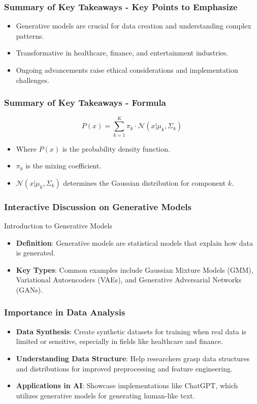 \documentclass[aspectratio=169]{beamer}
\begin{document}
\begin{frame}[fragile]
    \frametitle{Summary of Key Takeaways - Key Points to Emphasize}
    \begin{itemize}
        \item Generative models are crucial for data creation and understanding complex patterns.
        \item Transformative in healthcare, finance, and entertainment industries.
        \item Ongoing advancements raise ethical considerations and implementation challenges.
    \end{itemize}
\end{frame}

\begin{frame}[fragile]
    \frametitle{Summary of Key Takeaways - Formula}
    \begin{equation}
        P(x) = \sum_{k=1}^{K} \pi_k \cdot \mathcal{N}(x | \mu_k, \Sigma_k)
    \end{equation}
    \begin{itemize}
        \item Where \(P(x)\) is the probability density function.
        \item \(\pi_k\) is the mixing coefficient.
        \item \(\mathcal{N}(x | \mu_k, \Sigma_k)\) determines the Gaussian distribution for component \(k\).
    \end{itemize}
\end{frame}

\begin{frame}[fragile]
    \frametitle{Interactive Discussion on Generative Models}
    \begin{block}{Introduction to Generative Models}
        \begin{itemize}
            \item \textbf{Definition}: Generative models are statistical models that explain how data is generated.
            \item \textbf{Key Types}: Common examples include Gaussian Mixture Models (GMM), Variational Autoencoders (VAEs), and Generative Adversarial Networks (GANs).
        \end{itemize}
    \end{block}
\end{frame}

\begin{frame}[fragile]
    \frametitle{Importance in Data Analysis}
    \begin{itemize}
        \item \textbf{Data Synthesis}: Create synthetic datasets for training when real data is limited or sensitive, especially in fields like healthcare and finance.
        \item \textbf{Understanding Data Structure}: Help researchers grasp data structures and distributions for improved preprocessing and feature engineering.
        \item \textbf{Applications in AI}: Showcase implementations like ChatGPT, which utilizes generative models for generating human-like text.
    \end{itemize}
\end{frame}
\end{document}

